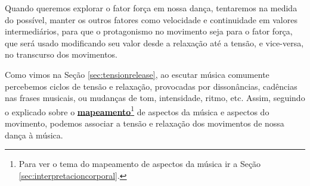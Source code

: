Quando queremos explorar o fator força em nossa dança, tentaremos na medida do possível,
manter os outros fatores como velocidade e continuidade em valores intermediários,
para que o protagonismo no movimento seja para o fator força,
que será usado modificando seu valor desde a relaxação até a tensão, e vice-versa, no transcurso dos movimentos. 

Como vimos na Seção \ref{sec:tensionrelease}, 
ao escutar música comumente percebemos ciclos de tensão e relaxação,
provocadas por dissonâncias,  cadências nas frases musicais, ou mudanças de
tom, intensidade, ritmo, etc.
Assim, 
seguindo o explicado sobre o \hyperref[sec:interpretacioncorporal]{\textbf{mapeamento}}\footnote{Para
ver o tema do mapeamento de aspectos da música ir a Seção \ref{sec:interpretacioncorporal}.} 
de aspectos da música e aspectos do movimento,
podemos associar a tensão e relaxação dos movimentos de nossa dança à música.



